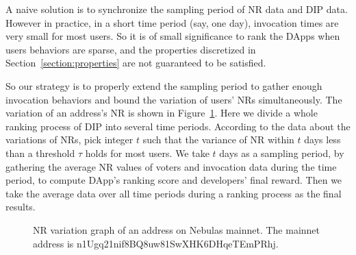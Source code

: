   A naive solution is to synchronize the sampling period of NR data and DIP data. However in practice, in a short time period (say, one day),  invocation times are very small for most users. So it is of small significance to rank the DApps when users behaviors are sparse, and the properties discretized  in Section~\ref{section:properties} are not guaranteed to be satisfied.

  So our strategy is to properly extend the sampling period to gather enough invocation behaviors and bound the variation of users' NRs simultaneously. The variation of  an address's NR is shown in Figure~\ref{fig:nr}. Here we divide a whole ranking process of DIP into several time periods. According to the data about the variations of NRs, pick integer $t$ such that the variance of NR within $t$ days less than a threshold $\tau$ holds for most users. We take $t$ days as a sampling period, by gathering the average NR values of voters and invocation data during the time period, to compute DApp's ranking score and developers' final reward. Then we take the average data over all time periods during a ranking process as the final  results.

  \begin{figure}
  	\label{fig:nr}
  	\centering
  	
  	\caption{NR variation graph of an address on Nebulas mainnet. The mainnet address is n1Ugq21nif8BQ8uw81SwXHK6DHqeTEmPRhj.}
  \end{figure}
